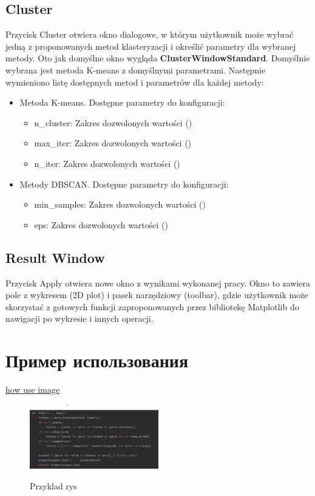 	\subsection{Cluster}
		Przycisk Cluster otwiera okno dialogowe, w którym użytkownik może wybrać jedną z proponowanych metod klasteryzacji i określić parametry dla wybranej metody. Oto jak domyślne okno wygląda \textbf{ClusterWindowStandard}. Domyślnie wybrana jest metoda K-means z domyślnymi parametrami.
		Następnie wymieniono listę dostępnych metod i parametrów dla każdej metody:
		\begin{itemize}
			\item Metoda K-means. Dostępne parametry do konfiguracji:
			\begin{itemize}
				\item n\_cluster: Zakres dozwolonych wartości ()
				\item max\_iter: Zakres dozwolonych wartości ()
				\item n\_iter: Zakres dozwolonych wartości ()
			\end{itemize}
			\item Metody DBSCAN. Dostępne parametry do konfiguracji:
			\begin{itemize}
				\item min\_samples: Zakres dozwolonych wartości ()
				\item eps: Zakres dozwolonych wartości ()
			\end{itemize}
		\end{itemize}
			
		\subsection{Result Window}		
			Przycisk Apply otwiera nowe okno z wynikami wykonanej pracy. Okno to zawiera pole z wykresem (2D plot) i pasek narzędziowy (toolbar), gdzie użytkownik może skorzystać z gotowych funkcji zaproponowanych przez bibliotekę Matplotlib do nawigacji po wykresie i innych operacji. 
			

\section{Пример использования}


	\underline{how use image}
	\begin{figure}
		\centering
		\scalebox{0.25} {\includegraphics[width=0.5\textwidth]{./img/rys1.jpg	}}
		\caption{Przyklad rys}
		\label{fig:rys1}
	\end{figure}
		
